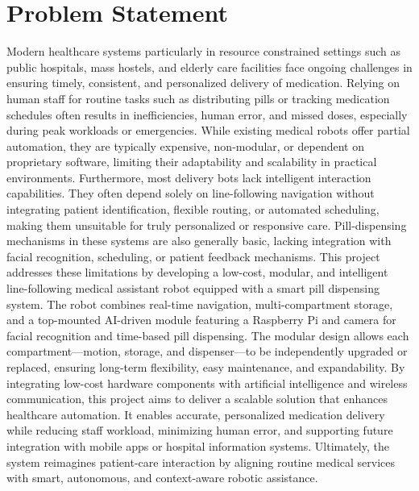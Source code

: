 \vspace{1.5\baselineskip} 

\section{Problem Statement}
Modern healthcare systems particularly in resource constrained settings such as public hospitals, mass hostels, and elderly care facilities face ongoing challenges in ensuring timely, consistent, and personalized delivery of medication. Relying on human staff for routine tasks such as distributing pills or tracking medication schedules often results in inefficiencies, human error, and missed doses, especially during peak workloads or emergencies. While existing medical robots offer partial automation, they are typically expensive, non-modular, or dependent on proprietary software, limiting their adaptability and scalability in practical environments.
Furthermore, most delivery bots lack intelligent interaction capabilities. They often depend solely on line-following navigation without integrating patient identification, flexible routing, or automated scheduling, making them unsuitable for truly personalized or responsive care. Pill-dispensing mechanisms in these systems are also generally basic, lacking integration with facial recognition, scheduling, or patient feedback mechanisms.
This project addresses these limitations by developing a low-cost, modular, and intelligent line-following medical assistant robot equipped with a smart pill dispensing system. The robot combines real-time navigation, multi-compartment storage, and a top-mounted AI-driven module featuring a Raspberry Pi and camera for facial recognition and time-based pill dispensing. The modular design allows each compartment—motion, storage, and dispenser—to be independently upgraded or replaced, ensuring long-term flexibility, easy maintenance, and expandability.
By integrating low-cost hardware components with artificial intelligence and wireless communication, this project aims to deliver a scalable solution that enhances healthcare automation. It enables accurate, personalized medication delivery while reducing staff workload, minimizing human error, and supporting future integration with mobile apps or hospital information systems. Ultimately, the system reimagines patient-care interaction by aligning routine medical services with smart, autonomous, and context-aware robotic assistance.
\vspace{2\baselineskip}

\vspace{1.5\baselineskip} 


